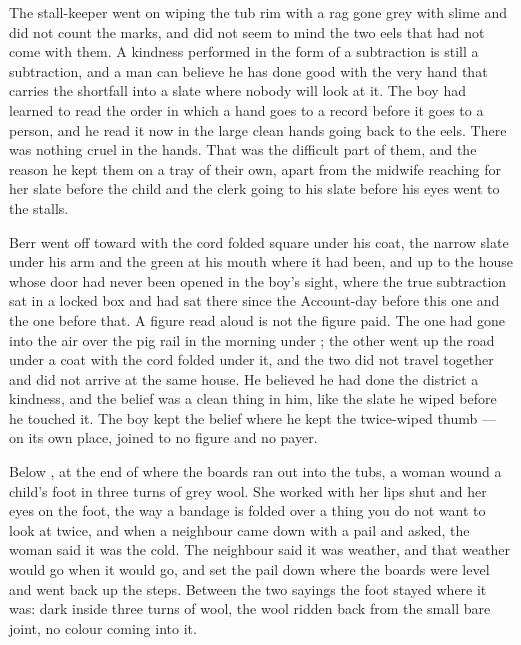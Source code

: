 The stall-keeper went on wiping the tub rim with a rag gone grey with slime and did not count the marks, and did not seem to mind the two eels that had not come with them. A kindness performed in the form of a subtraction is still a subtraction, and a man can believe he has done good with the very hand that carries the shortfall into a slate where nobody will look at it. The boy had learned to read the order in which a hand goes to a record before it goes to a person, and he read it now in the large clean hands going back to the eels. There was nothing cruel in the hands. That was the difficult part of them, and the reason he kept them on a tray of their own, apart from the midwife reaching for her slate before the child and the clerk going to his slate before his eyes went to the stalls.

Berr went off toward  with the cord folded square under his coat, the narrow slate under his arm and the green at his mouth where it had been, and up  to the house whose door had never been opened in the boy's sight, where the true subtraction sat in a locked box and had sat there since the Account-day before this one and the one before that. A figure read aloud is not the figure paid. The one had gone into the air over the pig rail in the morning under ; the other went up the road under a coat with the cord folded under it, and the two did not travel together and did not arrive at the same house. He believed he had done the district a kindness, and the belief was a clean thing in him, like the slate he wiped before he touched it. The boy kept the belief where he kept the twice-wiped thumb — on its own place, joined to no figure and no payer.

\scenebreak

Below , at the end of  where the boards ran out into the tubs, a woman wound a child's foot in three turns of grey wool. She worked with her lips shut and her eyes on the foot, the way a bandage is folded over a thing you do not want to look at twice, and when a neighbour came down with a pail and asked, the woman said it was the cold. The neighbour said it was weather, and that weather would go when it would go, and set the pail down where the boards were level and went back up the steps. Between the two sayings the foot stayed where it was: dark inside three turns of wool, the wool ridden back from the small bare joint, no colour coming into it.

